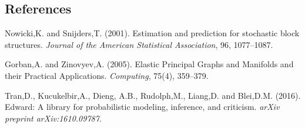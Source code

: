 \documentclass[12pt]{article}
\begin{document}
%        
%
%        

\subsection*{References}

\begin{description}

\item  Nowicki,K. and Snijders,T. (2001). Estimation and prediction for stochastic block structures. \textit{Journal of the American Statistical Association}, 96, 1077--1087.

\item 
Gorban,A. and Zinovyev,A. (2005). Elastic Principal Graphs and Manifolds and their Practical Applications. \textit{Computing}, 75(4), 359--379.

\item 
Tran,D., Kucukelbir,A., Dieng, A.B., Rudolph,M., Liang,D. and Blei,D.M. (2016). Edward: A library for probabilistic modeling, inference, and criticism. \textit{arXiv preprint arXiv:1610.09787}.


\end{description}
\end{document}
